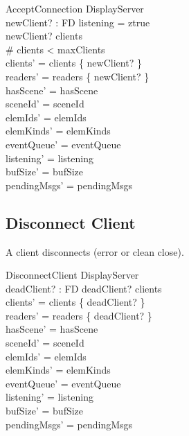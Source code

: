 \documentclass[a4paper,10pt,fleqn]{article}
\begin{document}
\begin{schema}{AcceptConnection}
  \Delta DisplayServer \\
  newClient? : FD
  \where
  listening = ztrue \\
  newClient? \notin clients \\
  \# clients < maxClients \\
  clients' = clients \cup \{ newClient? \} \\
  readers' = readers \cup \{ newClient? \} \\
  hasScene' = hasScene \\
  sceneId' = sceneId \\
  elemIds' = elemIds \\
  elemKinds' = elemKinds \\
  eventQueue' = eventQueue \\
  listening' = listening \\
  bufSize' = bufSize \\
  pendingMsgs' = pendingMsgs
\end{schema}

\subsection{Disconnect Client}

A client disconnects (error or clean close).

\begin{schema}{DisconnectClient}
  \Delta DisplayServer \\
  deadClient? : FD
  \where
  deadClient? \in clients \\
  clients' = clients \setminus \{ deadClient? \} \\
  readers' = readers \setminus \{ deadClient? \} \\
  hasScene' = hasScene \\
  sceneId' = sceneId \\
  elemIds' = elemIds \\
  elemKinds' = elemKinds \\
  eventQueue' = eventQueue \\
  listening' = listening \\
  bufSize' = bufSize \\
  pendingMsgs' = pendingMsgs
\end{schema}

\end{document}
